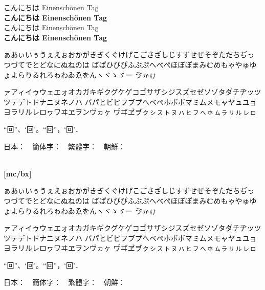 \documentclass[a4paper,titlepage,draft\@landscape@]{\class}
\newif\ifdeluxemode\deluxemodefalse
\begin{document}
{\footnotesize
\ifdeluxemode
{\mcfamily\ltseries
\UTFC{4F60}\UTFC{597D} \UTFT{60A8}\UTFT{597D} \UTFK{C548}\UTFK{B155} %
こんにちは Einenschönen Tag\\
}%
\fi%
{\mcfamily
{}   %
こんにちは Einenschönen Tag\\
}%
{\mcfamily\bfseries
{}   %
こんにちは Einenschönen Tag\\
}%
{\gtfamily
{}   %
こんにちは Einenschönen Tag\\
}%
{\gtfamily\bfseries
{}   %
こんにちは Einenschönen Tag\\
}%
\ifdeluxemode
{\gtfamily\ebseries
\UTFC{4F60}\UTFC{597D} \UTFT{60A8}\UTFT{597D} \UTFK{C548}\UTFK{B155} %
こんにちは Einenschönen Tag\\
}%
{\mgfamily
\UTFC{4F60}\UTFC{597D} \UTFT{60A8}\UTFT{597D} \UTFK{C548}\UTFK{B155} %
こんにちは Einenschönen Tag\\
}%
\fi%
}

\clearpage
[mc/m]

ぁあぃいぅうぇえぉおかがきぎくぐけげこごさざしじすずせぜそぞただちぢっつづてでとどなにぬねのは
ばぱひびぴふぶぷへべぺほぼぽまみむめもゃやゅゆょよらりるれろゎわゐゑをんヽヾゝゞー
\ifuptexmode
ゔゕゖ
\fi

ァアィイゥウェエォオカガキギクグケゲコゴサザシジスズセゼソゾタダチヂッツヅテデトドナニヌネノハ
バパヒビピフブプヘベペホボポマミムメモャヤュユョヨラリルレロヮワヰヱヲンヴヵヶ
\ifuptexmode
ヷヸヹヺㇰㇱㇲㇳㇴㇵㇶㇷㇸㇹㇺㇻㇼㇽㇾㇿ
\fi

“回”、‘回’。“回”，‘回’．

日本：~~簡体字：~~繁體字：~~朝鮮：\\
~~%
~~%

{\bfseries%
[mc/bx]

ぁあぃいぅうぇえぉおかがきぎくぐけげこごさざしじすずせぜそぞただちぢっつづてでとどなにぬねのは
ばぱひびぴふぶぷへべぺほぼぽまみむめもゃやゅゆょよらりるれろゎわゐゑをんヽヾゝゞー
\ifuptexmode
ゔゕゖ
\fi

ァアィイゥウェエォオカガキギクグケゲコゴサザシジスズセゼソゾタダチヂッツヅテデトドナニヌネノハ
バパヒビピフブプヘベペホボポマミムメモャヤュユョヨラリルレロヮワヰヱヲンヴヵヶ
\ifuptexmode
ヷヸヹヺㇰㇱㇲㇳㇴㇵㇶㇷㇸㇹㇺㇻㇼㇽㇾㇿ
\fi

“回”、‘回’。“回”，‘回’．

日本：~~簡体字：~~繁體字：~~朝鮮：\\
~~%
~~%
}
\end{document}
